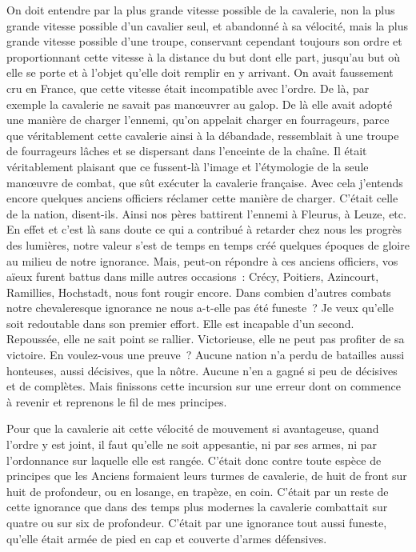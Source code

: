 \documentclass[french,twoside]{book} %
\begin{document}
On doit entendre par la plus grande vitesse possible de la cavalerie, non la plus grande vitesse possible d’un cavalier seul, et abandonné à sa vélocité, mais la plus grande vitesse possible d’une troupe, conservant cependant toujours son ordre et proportionnant cette vitesse à la distance du but dont elle part, jusqu’au but où elle se porte et à l’objet qu’elle doit remplir en y arrivant. On avait faussement cru en France, que cette vitesse était incompatible avec l’ordre. De là, par exemple la cavalerie ne savait pas manœuvrer au galop. De là elle avait adopté une manière de charger l’ennemi, qu’on appelait charger en fourrageurs, parce que véritablement cette cavalerie ainsi à la débandade, ressemblait à une troupe de fourrageurs lâches et se dispersant dans l’enceinte de la chaîne. Il était véritablement plaisant que ce fussent-là l’image et l’étymologie de la seule manœuvre de combat, que sût exécuter la cavalerie française. Avec cela j’entends encore quelques anciens officiers réclamer cette manière de charger. C’était celle de la nation, disent-ils. Ainsi nos pères battirent l’ennemi à Fleurus, à Leuze, etc. En effet et c’est là sans doute ce qui a contribué à retarder chez nous les progrès des lumières, notre valeur s’est de temps en temps créé quelques époques de gloire au milieu de notre ignorance. Mais, peut-on répondre à ces anciens officiers, vos aïeux furent battus dans mille autres occasions : Crécy, Poitiers, Azincourt, Ramillies, Hochstadt, nous font rougir encore. Dans combien d’autres combats notre chevaleresque ignorance ne nous a-t-elle pas été funeste ? Je veux qu’elle soit redoutable dans son premier effort. Elle est incapable d’un second. Repoussée, elle ne sait point se rallier. Victorieuse, elle ne peut pas profiter de sa victoire. En voulez-vous une preuve ? Aucune nation n’a perdu de batailles aussi honteuses, aussi décisives, que la nôtre. Aucune n’en a gagné si peu de décisives et de complètes. Mais finissons cette incursion sur une erreur dont on commence à revenir et reprenons le fil de mes principes.\par
Pour que la cavalerie ait cette vélocité de mouvement si avantageuse, quand l’ordre y est joint, il faut qu’elle ne soit appesantie, ni par ses armes, ni par l’ordonnance sur laquelle elle est rangée. C’était donc contre toute espèce de principes que les Anciens formaient leurs turmes de cavalerie, de huit de front sur huit de profondeur, ou en losange, en trapèze, en coin. C’était par un reste de cette ignorance que dans des temps plus modernes la cavalerie combattait sur quatre ou sur six de profondeur. C’était par une ignorance tout aussi funeste, qu’elle était armée de pied en cap et couverte d’armes défensives.\par
\end{document}
